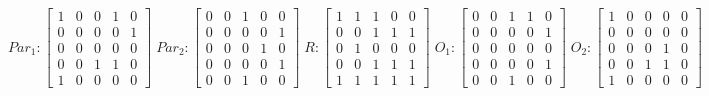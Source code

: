     $$
        Par_{1} : \begin{bmatrix}
            1 & 0 & 0 & 1 & 0 \\
            0 & 0 & 0 & 0 & 1 \\
            0 & 0 & 0 & 0 & 0 \\
			0 & 0 & 1 & 1 & 0 \\
            1 & 0 & 0 & 0 & 0 
        \end{bmatrix}
        \;
         Par_{2} : \begin{bmatrix}
            0 & 0 & 1 & 0 & 0 \\
            0 & 0 & 0 & 0 & 1 \\
            0 & 0 & 0 & 1 & 0 \\
            0 & 0 & 0 & 0 & 1 \\
            0 & 0 & 1 & 0 & 0
        \end{bmatrix}
        \;
        R : \begin{bmatrix}
            1 & 1 & 1 & 0 & 0 \\
            0 & 0 & 1 & 1 & 1 \\
            0 & 1 & 0 & 0 & 0 \\
            0 & 0 & 1 & 1 & 1 \\
            1 & 1 & 1 & 1 & 1
        \end{bmatrix}
        \;
        O_{1} : \begin{bmatrix}
            0 & 0 & 1 & 1 & 0 \\
            0 & 0 & 0 & 0 & 1 \\
            0 & 0 & 0 & 0 & 0 \\
            0 & 0 & 0 & 0 & 1 \\
            0 & 0 & 1 & 0 & 0
        \end{bmatrix}
        \;
        O_{2} : \begin{bmatrix}
            1 & 0 & 0 & 0 & 0 \\
            0 & 0 & 0 & 0 & 0 \\
            0 & 0 & 0 & 1 & 0 \\
            0 & 0 & 1 & 1 & 0 \\
            1 & 0 & 0 & 0 & 0
        \end{bmatrix}
    $$
